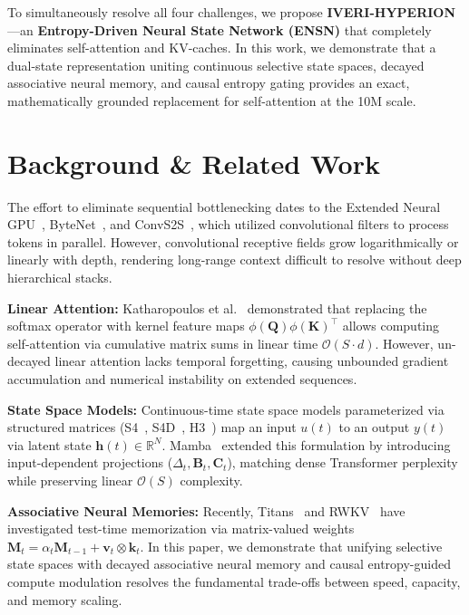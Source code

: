 \documentclass[10pt,twocolumn,letterpaper]{article}
\begin{document}
To simultaneously resolve all four challenges, we propose \textbf{IVERI-HYPERION}—an \textbf{Entropy-Driven Neural State Network (ENSN)} that completely eliminates self-attention and KV-caches. In this work, we demonstrate that a dual-state representation uniting continuous selective state spaces, decayed associative neural memory, and causal entropy gating provides an exact, mathematically grounded replacement for self-attention at the 10M scale.

\section{Background \& Related Work}
\label{sec:background}

The effort to eliminate sequential bottlenecking dates to the Extended Neural GPU~\cite{kaiser2016neuralgpu}, ByteNet~\cite{kalchbrenner2016bytenet}, and ConvS2S~\cite{gehring2017convs2s}, which utilized convolutional filters to process tokens in parallel. However, convolutional receptive fields grow logarithmically or linearly with depth, rendering long-range context difficult to resolve without deep hierarchical stacks.

\textbf{Linear Attention:} Katharopoulos et al.~\cite{katharopoulos2020transformers} demonstrated that replacing the softmax operator with kernel feature maps $\phi(\mathbf{Q})\phi(\mathbf{K})^\top$ allows computing self-attention via cumulative matrix sums in linear time $\mathcal{O}(S \cdot d)$. However, un-decayed linear attention lacks temporal forgetting, causing unbounded gradient accumulation and numerical instability on extended sequences.

\textbf{State Space Models:} Continuous-time state space models parameterized via structured matrices (S4~\cite{gu2021s4}, S4D~\cite{gu2022s4d}, H3~\cite{fu2023h3}) map an input $u(t)$ to an output $y(t)$ via latent state $\mathbf{h}(t) \in \mathbb{R}^N$. Mamba~\cite{gu2023mamba} extended this formulation by introducing input-dependent projections ($\Delta_t, \mathbf{B}_t, \mathbf{C}_t$), matching dense Transformer perplexity while preserving linear $\mathcal{O}(S)$ complexity.

\textbf{Associative Neural Memories:} Recently, Titans~\cite{behrouz2024titans} and RWKV~\cite{peng2023rwkv} have investigated test-time memorization via matrix-valued weights $\mathbf{M}_t = \alpha_t \mathbf{M}_{t-1} + \mathbf{v}_t \otimes \mathbf{k}_t$. In this paper, we demonstrate that unifying selective state spaces with decayed associative neural memory and causal entropy-guided compute modulation resolves the fundamental trade-offs between speed, capacity, and memory scaling.
\end{document}
